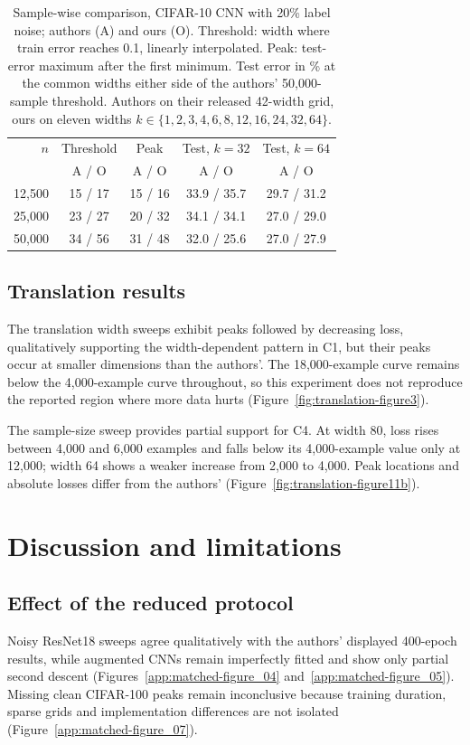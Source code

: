 \documentclass{article}
\begin{document}
\begin{table}[t]
\centering
\small
\setlength{\tabcolsep}{4pt}
\begin{tabular}{@{}rcccc@{}}
\toprule
$n$ & Threshold & Peak & Test, $k=32$ & Test, $k=64$\\
 & A / O & A / O & A / O & A / O\\
\midrule
12,500 & 15 / 17 & 15 / 16 & 33.9 / 35.7 & 29.7 / 31.2\\
25,000 & 23 / 27 & 20 / 32 & 34.1 / 34.1 & 27.0 / 29.0\\
50,000 & 34 / 56 & 31 / 48 & 32.0 / 25.6 & 27.0 / 27.9\\
\bottomrule
\end{tabular}
\caption{Sample-wise comparison, CIFAR-10 CNN with 20\% label noise;
authors (A) and ours (O). Threshold: width where train error reaches 0.1,
linearly interpolated. Peak: test-error maximum after the first minimum.
Test error in \% at the common widths either side of the authors'
50,000-sample threshold. Authors on their released 42-width grid, ours on
eleven widths $k\in\{1,2,3,4,6,8,12,\allowbreak16,24,32,64\}$.}
\label{tab:samplewise}
\end{table}

\subsection{Translation results}\label{sec:translation-res}
The translation width sweeps exhibit peaks followed by decreasing loss,
qualitatively supporting the width-dependent pattern in C1, but their peaks
occur at smaller dimensions than the authors'. The 18,000-example curve
remains below the 4,000-example curve throughout, so this experiment does
not reproduce the reported region where more data hurts
(Figure~\ref{fig:translation-figure3}).

The sample-size sweep provides partial support for C4. At width 80, loss
rises between 4,000 and 6,000 examples and falls below its 4,000-example
value only at 12,000; width 64 shows a weaker increase from 2,000 to 4,000.
Peak locations and absolute losses differ from the authors'
(Figure~\ref{fig:translation-figure11b}).

\section{Discussion and limitations}
\subsection{Effect of the reduced protocol}
Noisy ResNet18 sweeps agree qualitatively with the authors' displayed 400-epoch results, while augmented CNNs remain imperfectly fitted and show only partial second descent (Figures~\ref{app:matched-figure_04} and~\ref{app:matched-figure_05}). Missing clean CIFAR-100 peaks remain inconclusive because training duration, sparse grids and implementation differences are not isolated (Figure~\ref{app:matched-figure_07}).
\end{document}
